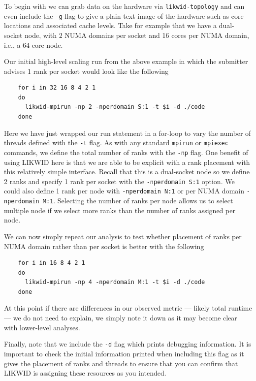 \begin{instructions}{\likwid}
  To begin with we can grab data on the hardware via \texttt{likwid-topology} and can even include the \texttt{-g} flag to give a plain text image of the hardware such as core locations and associated cache levels. Take for example that we have a dual-socket node, with 2 NUMA domains per socket and 16 cores per NUMA domain, i.e., a 64 core node.
 
  Our initial high-level scaling run from the above example in which the submitter advises 1 rank per socket would look like the following
  \begin{verbatim}
    for i in 32 16 8 4 2 1
    do
      likwid-mpirun -np 2 -nperdomain S:1 -t $i -d ./code
    done
  \end{verbatim}
  Here we have just wrapped our run statement in a for-loop to vary the number of threads defined with the \texttt{-t} flag. As with any standard \texttt{mpirun} or \texttt{mpiexec} commands, we define the total number of ranks with the \texttt{-np} flag. One benefit of using LIKWID here is that we are able to be explicit with a rank placement with this relatively simple interface. Recall that this is a dual-socket node so we define 2 ranks and specify 1 rank per socket with the \texttt{-nperdomain S:1} option. We could also define 1 rank per node with \texttt{-nperdomain N:1} or per NUMA domain \texttt{-nperdomain M:1}. Selecting the number of ranks per node allows us to select multiple node if we select more ranks than the number of ranks assigned per node.

  We can now simply repeat our analysis to test whether placement of ranks per NUMA domain rather than per socket is better with the following
  \begin{verbatim}
    for i in 16 8 4 2 1
    do
      likwid-mpirun -np 4 -nperdomain M:1 -t $i -d ./code
    done
  \end{verbatim}
  At this point if there are differences in our observed metric --- likely total runtime --- we do not need to explain, we simply note it down as it may become clear with lower-level analyses.

  Finally, note that we include the \texttt{-d} flag which prints debugging information. It is important to check the initial information printed when including this flag as it gives the placement of ranks and threads to ensure that you can confirm that LIKWID is assigning these resources as you intended.
\end{instructions}

